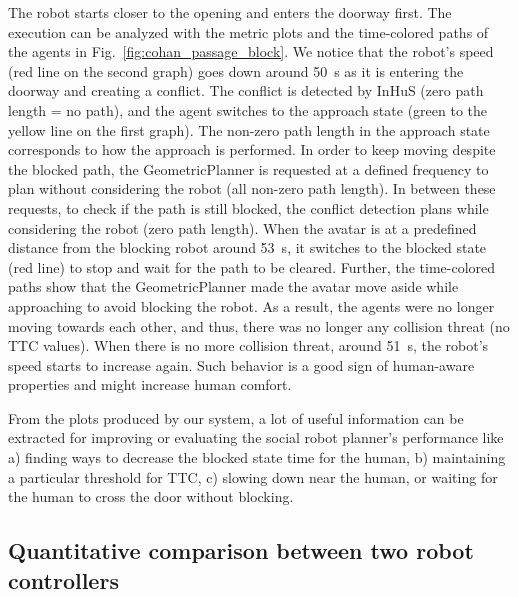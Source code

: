 The robot starts closer to the opening and enters the doorway first. The execution can be analyzed with the metric plots and the time-colored paths of the agents in Fig.~\ref{fig:cohan_passage_block}. We notice that the robot's speed (red line on the second graph) goes down around \SI{50}{\second} as it is entering the doorway and creating a conflict. The conflict is detected by InHuS (zero path length = no path), and the agent switches to the approach state (green to the yellow line on the first graph).
The non-zero path length in the approach state corresponds to how the approach is performed. In order to keep moving despite the blocked path, the GeometricPlanner is requested at a defined frequency to plan without considering the robot (all non-zero path length). In between these requests, to check if the path is still blocked, the conflict detection plans while considering the robot (zero path length). When the avatar is at a predefined distance from the blocking robot around \SI{53}{\second}, it switches to the blocked state (red line) to stop and wait for the path to be cleared. Further, the time-colored paths show that the GeometricPlanner made the avatar move aside while approaching to avoid blocking the robot. As a result, the agents were no longer moving towards each other, and thus, there was no longer any collision threat (no TTC values). When there is no more collision threat, around \SI{51}{\second}, the robot's speed starts to increase again. Such behavior is a good sign of human-aware properties and might increase human comfort.

From the plots produced by our system, a lot of useful information can be extracted for improving or evaluating the social robot planner's performance like a) finding ways to decrease the blocked state time for the human, b) maintaining a particular threshold for TTC, c) slowing down near the human, or waiting for the human to cross the door without blocking.


\subsection{Quantitative comparison between two robot controllers}

